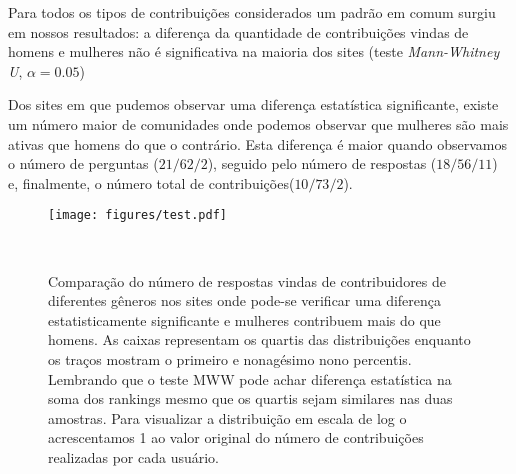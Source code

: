 Para todos os tipos de contribuições considerados um padrão em comum surgiu em nossos resultados: a diferença da quantidade de contribuições vindas de homens e mulheres não é significativa na maioria dos sites (teste \emph{Mann-Whitney U}, $\alpha = 0.05$)


Dos sites em que pudemos observar uma diferença estatística significante, existe um número maior de comunidades onde podemos observar que mulheres são mais ativas que homens do que o contrário. Esta diferença é maior quando observamos o número de perguntas ($21/62/2$), seguido pelo número de respostas ($18/56/11$) e, finalmente, o número total de contribuições($10/73/2$). 

\begin{figure}
  \centering
  \texttt{[image: figures/test.pdf]}
  \caption[Comparação do número de respostas em comunidades onde mulheres respondem mais.]{Comparação do número de respostas vindas de contribuidores de diferentes gêneros nos sites onde pode-se verificar uma diferença estatisticamente significante e mulheres contribuem mais do que homens. As caixas representam os quartis das distribuições enquanto os traços mostram o primeiro e nonagésimo nono percentis. Lembrando que o teste MWW pode achar diferença estatística na soma dos rankings mesmo que os quartis sejam similares nas duas amostras. Para visualizar a distribuição em escala de log o acrescentamos 1 ao valor original do número de contribuições realizadas por cada usuário.}~\label{figure:answers}
\end{figure}


